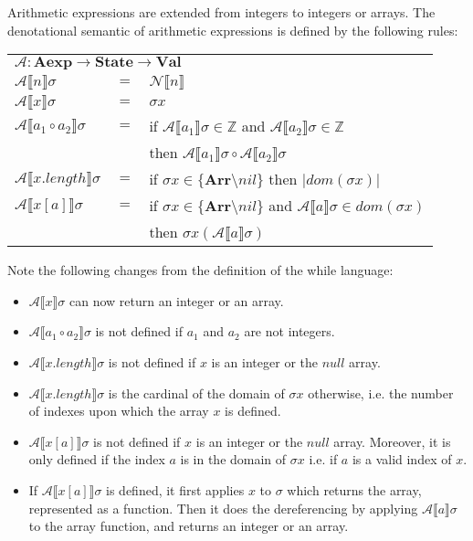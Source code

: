 \documentclass{article}
\begin{document}
Arithmetic expressions are extended from integers to integers or arrays.
The denotational semantic of arithmetic expressions is defined by the following rules:
\begin{center}
\begin{tabular}{ l c l }
\multicolumn{3}{l}{\(\mathcal{A}: \textbf{Aexp} \rightarrow \textbf{State} \rightarrow \textbf{Val}\)} \\
 \(\mathcal{A}\llbracket n \rrbracket \sigma \) & \(=\) & \(\mathcal{N}\llbracket n \rrbracket\)\\ 
 \(\mathcal{A}\llbracket x \rrbracket \sigma \) & \(=\) & \(\sigma x\)\\  
 \(\mathcal{A}\llbracket a_1 \circ a_2 \rrbracket \sigma \) & \(=\) &
    if \(\mathcal{A}\llbracket a_1\rrbracket \sigma \in \mathbb{Z}\) and \(\mathcal{A}\llbracket a_2\rrbracket \sigma \in \mathbb{Z}\)\\
    & & then \(\mathcal{A}\llbracket a_1\rrbracket \sigma \circ \mathcal{A}\llbracket a_2\rrbracket \sigma\)\\ 
 \(\mathcal{A}\llbracket x.length \rrbracket \sigma \) & \(=\) & if \(\sigma x \in \{\textbf{Arr} \setminus {nil}\}\) then \(|dom(\sigma x)|\) \\ 
 \(\mathcal{A}\llbracket x[a] \rrbracket \sigma \) & \(=\) &
    if \(\sigma x \in \{\textbf{Arr} \setminus {nil}\}\) and \(\mathcal{A}\llbracket a\rrbracket \sigma \in dom(\sigma x)\)\\
    & & then \(\sigma x (\mathcal{A}\llbracket a\rrbracket \sigma)\)
\end{tabular}
\end{center}
Note the following changes from the definition of the while language:
\begin{itemize}
\item \(\mathcal{A}\llbracket x \rrbracket \sigma \) can now return an integer or an array.
\item \(\mathcal{A}\llbracket a_1 \circ a_2 \rrbracket \sigma \) is not defined if \(a_1\) and \(a_2\) are not integers.
\item \(\mathcal{A}\llbracket x.length \rrbracket \sigma \) is not defined if \(x\) is an integer or the \(null\) array.
\item \(\mathcal{A}\llbracket x.length \rrbracket \sigma \) is the cardinal of the domain of \(\sigma x\) otherwise, i.e. the number of indexes upon which the array \(x\) is defined.
\item \(\mathcal{A}\llbracket x[a] \rrbracket \sigma \) is not defined if \(x\) is an integer or the \(null\) array. Moreover, it is only defined if the index \(a\) is in the domain of \(\sigma x\) i.e. if \(a\) is a valid index of \(x\).
\item If \(\mathcal{A}\llbracket x[a] \rrbracket \sigma \) is defined, it first applies \(x\) to \(\sigma\) which returns the array, represented as a function. Then it does the dereferencing by applying \(\mathcal{A}\llbracket a \rrbracket \sigma\) to the array function, and returns an integer or an array.
\end{itemize}
\end{document}
